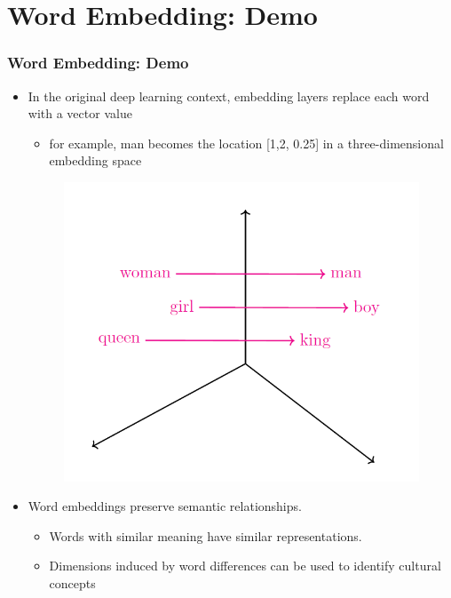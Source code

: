 \documentclass[
  shownotes,
  xcolor={svgnames},
  hyperref={colorlinks,citecolor=DarkBlue,linkcolor=DarkRed,urlcolor=DarkBlue}
  , aspectratio=169]{beamer}
\begin{document}
\section{Word Embedding: Demo }
\begin{frame}[fragile]
\frametitle{Word Embedding: Demo }
\pause
\begin{itemize}
  \item In the original deep learning context, embedding layers replace each word with a vector value
  \begin{itemize}
    \item for example, man becomes the location [1,2, 0.25] in a three-dimensional embedding space%
   
\end{itemize} 
  \begin{figure}[H] \centering
            \captionsetup{justification=centering}
              \includegraphics[scale=0.4]{figures/embedings.png}
              
 \end{figure}

 \item Word embeddings preserve semantic relationships.
  \begin{itemize}
    \item Words with similar meaning have similar representations.
    \medskip
    \item Dimensions induced by word differences can be used to identify cultural concepts 
  \end{itemize}
  \end{itemize} 
\end{frame}
\end{document}
